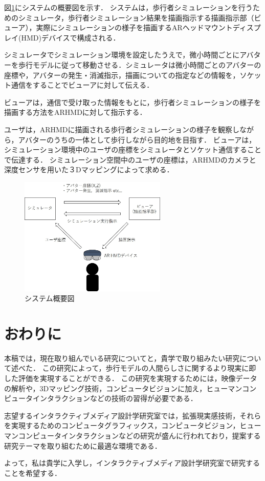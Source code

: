 \documentclass[twocolumn]{jarticle}%
\begin{document}
図\ref{fig:systemImage}にシステムの概要図を示す．
システムは，歩行者シミュレーションを行うためのシミュレータ，歩行者シミュレーション結果を描画指示する描画指示部（ビューア），実際にシミュレーションの様子を描画するARヘッドマウントディスプレイ(HMD)デバイスで構成される．

シミュレータでシミュレーション環境を設定したうえで，微小時間ごとにアバターを歩行モデルに従って移動させる．シミュレータは微小時間ごとのアバターの座標や，アバターの発生・消滅指示，描画についての指定などの情報を，ソケット通信をすることでビューアに対して伝える．

ビューアは，通信で受け取った情報をもとに，歩行者シミュレーションの様子を描画する方法をARHMDに対して指示する．

ユーザは，ARHMDに描画される歩行者シミュレーションの様子を観察しながら，アバターのうちの一体として歩行しながら目的地を目指す．
ビューアは，シミュレーション環境中のユーザの座標をシミュレータとソケット通信することで伝達する．
シミュレーション空間中のユーザの座標は，ARHMDのカメラと深度センサを用いた３Dマッピングによって求める．

\begin{figure}[htbp]
  \begin{center}
    \includegraphics[width=70mm]{images/systemImage.jpg}
  \end{center}
    \caption{システム概要図}
    \label{fig:systemImage}
\end{figure}

\section{おわりに}
本稿では，現在取り組んでいる研究についてと，貴学で取り組みたい研究について述べた．
この研究によって，歩行モデルの人間らしさに関するより現実に即した評価を実現することができる．
この研究を実現するためには，映像データの解析や，3Dマッピング技術，コンピュータビジョンに加え，ヒューマンコンピュータインタラクションなどの技術の習得が必要である．

志望するインタラクティブメディア設計学研究室では，拡張現実感技術，それらを実現するためのコンピュータグラフィックス，コンピュータビジョン，ヒューマンコンピュータインタラクションなどの研究が盛んに行われており，提案する研究テーマを取り組むために最適な環境である．

よって，私は貴学に入学し，インタラクティブメディア設計学研究室で研究することを希望する．





\end{document}
